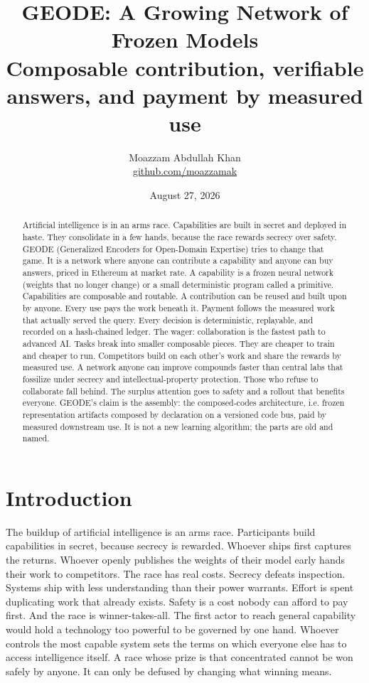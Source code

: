 \documentclass[11pt]{article}
\title{\bfseries GEODE: A Growing Network of Frozen Models\\[0.4em]
\large Composable contribution, verifiable answers, and payment by measured use}
\author{Moazzam Abdullah Khan\\[0.4em]
\large \href{https://github.com/moazzamak}{github.com/moazzamak}}
\date{August 27, 2026}
\begin{document}
\maketitle

\begin{abstract}
    Artificial intelligence is in an arms race. Capabilities are built
    in secret and deployed in haste. They consolidate in a few hands,
    because the race rewards secrecy over safety. GEODE (Generalized
    Encoders for Open-Domain Expertise) tries to change that game. It
    is a network where anyone can contribute a capability and anyone
    can buy answers, priced in Ethereum at market rate. A capability
    is a frozen neural network (weights that no longer change) or a
    small deterministic program called a primitive. Capabilities are
    composable and routable. A contribution can be reused and built
    upon by anyone. Every use pays the work beneath it. Payment
    follows the measured work that actually served the query. Every
    decision is deterministic, replayable, and recorded on a
    hash-chained ledger. The wager: collaboration is the fastest path
    to advanced AI. Tasks break into smaller composable pieces. They
    are cheaper to train and cheaper to run. Competitors build on each
    other's work and share the rewards by measured use. A network
    anyone can improve compounds faster than central labs that
    fossilize under secrecy and intellectual-property protection.
    Those who refuse to collaborate fall behind. The surplus attention goes to
    safety and a rollout that benefits everyone. GEODE's claim is the
    assembly: the composed-codes architecture, i.e. frozen representation
    artifacts composed by declaration on a versioned code bus, paid by
    measured downstream use. It is not a new learning algorithm; the
    parts are old and named.
\end{abstract}

\tableofcontents

\section{Introduction}

The buildup of artificial intelligence is an arms race. Participants
build capabilities in secret, because secrecy is rewarded. Whoever
ships first captures the returns. Whoever openly publishes the weights
of their model early hands their work to competitors. The race has
real costs. Secrecy defeats inspection. Systems ship with less
understanding than their power warrants. Effort is spent duplicating
work that already exists. Safety is a cost nobody can afford to pay
first. And the race is winner-takes-all. The first actor to reach
general capability would hold a technology too powerful to be governed
by one hand. Whoever controls the most capable system sets the terms
on which everyone else has to access intelligence itself. A race whose
prize is that concentrated cannot be won safely by anyone. It can only be
defused by changing what winning means.
\end{document}
